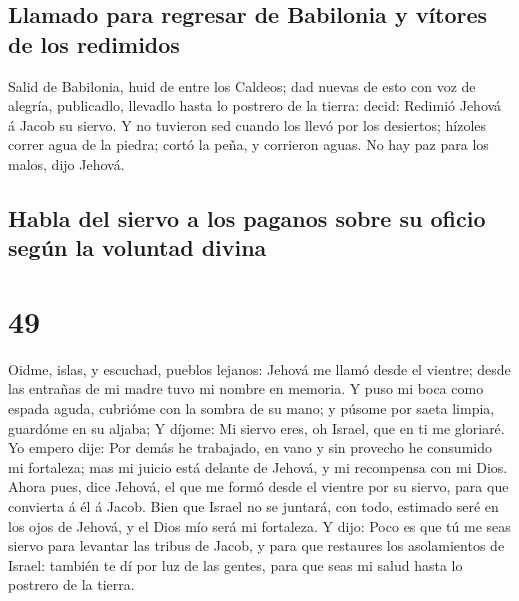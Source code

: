 \hypertarget{llamado-para-regresar-de-babilonia-y-vuxedtores-de-los-redimidos}{%
\subsection{Llamado para regresar de Babilonia y vítores de los
redimidos}\label{llamado-para-regresar-de-babilonia-y-vuxedtores-de-los-redimidos}}

 Salid de Babilonia, huid de entre los Caldeos; dad
nuevas de esto con voz de alegría, publicadlo, llevadlo hasta lo
postrero de la tierra: decid: Redimió Jehová á Jacob su siervo.
 Y no tuvieron sed cuando los llevó por los desiertos;
hízoles correr agua de la piedra; cortó la peña, y corrieron aguas.
 No hay paz para los malos, dijo Jehová.

\hypertarget{habla-del-siervo-a-los-paganos-sobre-su-oficio-seguxfan-la-voluntad-divina}{%
\subsection{Habla del siervo a los paganos sobre su oficio según la
voluntad
divina}\label{habla-del-siervo-a-los-paganos-sobre-su-oficio-seguxfan-la-voluntad-divina}}

\hypertarget{section-23-49}{%
\section{49}\label{section-23-49}}

 Oidme, islas, y escuchad, pueblos lejanos: Jehová me
llamó desde el vientre; desde las entrañas de mi madre tuvo mi nombre en
memoria.  Y puso mi boca como espada aguda, cubrióme con
la sombra de su mano; y púsome por saeta limpia, guardóme en su aljaba;
 Y díjome: Mi siervo eres, oh Israel, que en ti me
gloriaré.  Yo empero dije: Por demás he trabajado, en vano
y sin provecho he consumido mi fortaleza; mas mi juicio está delante de
Jehová, y mi recompensa con mi Dios.  Ahora pues, dice
Jehová, el que me formó desde el vientre por su siervo, para que
convierta á él á Jacob. Bien que Israel no se juntará, con todo,
estimado seré en los ojos de Jehová, y el Dios mío será mi fortaleza.
 Y dijo: Poco es que tú me seas siervo para levantar las
tribus de Jacob, y para que restaures los asolamientos de Israel:
también te dí por luz de las gentes, para que seas mi salud hasta lo
postrero de la tierra.


